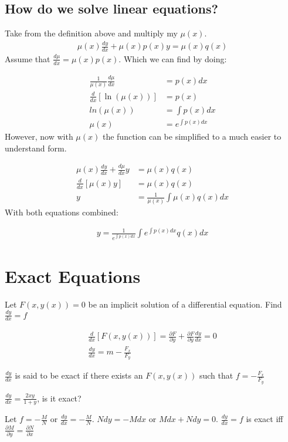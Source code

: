 \subsection{How do we solve linear equations?}

Take from the definition above and multiply my $\mu(x)$.
\begin{gather*}
    \mu(x)\frac{dy}{dx} + \mu(x) p(x)y = \mu(x) q(x)
\end{gather*}
Assume that $\frac{d\mu}{dx}=\mu(x)p(x)$. Which we can find by doing:

\begin{align*}
    \frac{1}{\mu(x)}\frac{d\mu}{dx} &= p(x)dx \\
    \frac{d}{dx}\left[ \ln (\mu(x)) \right] &= p(x) \\
    ln(\mu(x)) &= \int{p(x) dx} \\ 
    \mu(x) &= e^{\int{p(x) dx}}
\end{align*}
However, now with $\mu(x)$ the function can be simplified to a much easier to understand form.

\begin{align*}
    \mu(x)\frac{dy}{dx} + \frac{d\mu}{dx}y &= \mu(x)q(x) \\
    \frac{d}{dx}\left[ \mu(x)y \right] &= \mu(x)q(x) \\
    y &= \frac1{\mu(x)} \int{\mu(x)q(x)}dx
\end{align*}
With both equations combined:

\begin{gather*}
    y = \frac1{e^{\int{p(x) dx}}} \int{e^{\int{p(x) dx}}q(x)}dx
\end{gather*}

\section{Exact Equations}

Let $F(x, y(x)) = 0$ be an implicit solution of a differential equation. Find $\frac{dy}{dx} = f$

\begin{gather*}
    \frac{d}{dx}\left[ F(x,y(x)) \right] = \frac{\partial F}{\partial y} + \frac{\partial F}{\partial y} \frac{dy}{dx} = 0 \\
    \frac{dy}{dx} = m -\frac{F_x}{F_y}
\end{gather*}

\begin{definition}{}{}
    $\frac{dy}{dx}$ is said to be exact if there exists an $F(x,y(x))$ such that $f=-\frac{F_x}{F_y}$
\end{definition}

\begin{example}{}{}
    $\frac{dy}{dx} = \frac{2xy}{1 + y}$, is it exact?
\end{example}

\begin{theorem}{}{}
    Let $f=-\frac MN$ or $\frac{dy}{dx} = -\frac MN$. $Ndy = -Mdx$ or $Mdx + Ndy=0$. $\frac{dy}{dx} = f$ is exact iff $\frac{\partial M}{\partial y} = \frac{\partial N}{\partial x}$
\end{theorem}